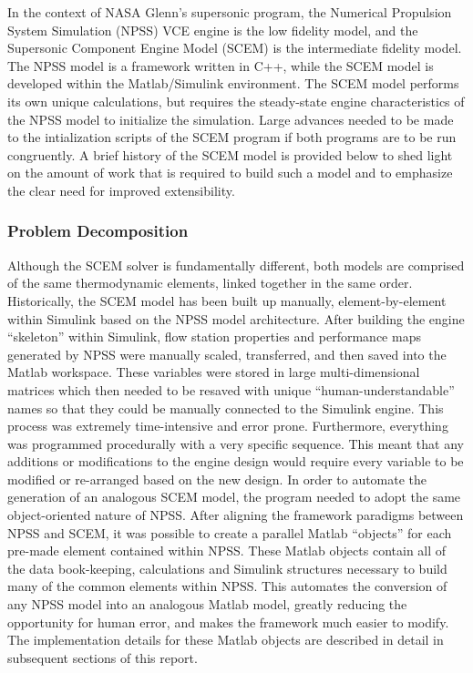 \documentclass[heading.tex]{subfiles}
\begin{document}
	In the context of NASA Glenn’s supersonic program, the Numerical Propulsion System Simulation (NPSS) VCE engine is the low fidelity model, and the Supersonic Component Engine Model (SCEM) is the intermediate fidelity model. The NPSS model is a framework written in C++, while the SCEM model is developed within the Matlab/Simulink environment. The SCEM model performs its own unique calculations, but requires the steady-state engine characteristics of the NPSS model to initialize the simulation. Large advances needed to be made to the intialization scripts of the SCEM program if both programs are to be run congruently. A brief history of the SCEM model is provided below to shed light on the amount of work that is required to build such a model and to emphasize the clear need for improved extensibility.  

\subsubsection{Problem Decomposition}

Although the SCEM solver is fundamentally different, both models are comprised of the same thermodynamic elements, linked together in the same order. Historically, the SCEM model has been built up manually, element-by-element within Simulink based on the NPSS model architecture. After building the engine “skeleton” within Simulink, flow station properties and performance maps generated by NPSS were manually scaled, transferred, and then saved into the Matlab workspace. These variables were stored in large multi-dimensional matrices which then needed to be resaved with unique “human-understandable” names so that they could be manually connected to the Simulink engine. This process was extremely time-intensive and error prone. Furthermore, everything was programmed procedurally with a very specific sequence. This meant that any additions or modifications to the engine design would require every variable to be modified or re-arranged based on the new design. In order to automate the generation of an analogous SCEM model, the program needed to adopt the same object-oriented nature of NPSS. After aligning the framework paradigms between NPSS and SCEM, it was possible to create a parallel Matlab “objects” for each pre-made element contained within NPSS. These Matlab objects contain all of the data book-keeping, calculations and Simulink structures necessary to build many of the common elements within NPSS. This automates the conversion of any NPSS model into an analogous Matlab model, greatly reducing the opportunity for human error, and makes the framework much easier to modify. The implementation details for these Matlab objects are described in detail in subsequent sections of this report.	
\end{document}
